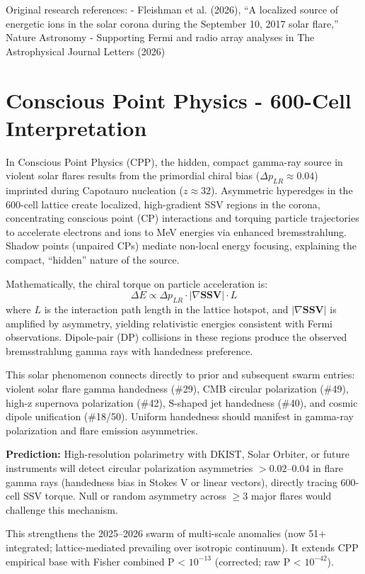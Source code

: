 \documentclass[11pt]{article}
\begin{document}
Original research references:  
- Fleishman et al. (2026), ``A localized source of energetic ions in the solar corona during the September 10, 2017 solar flare,'' Nature Astronomy  
- Supporting Fermi and radio array analyses in The Astrophysical Journal Letters (2026)

\section{Conscious Point Physics - 600-Cell Interpretation}
In Conscious Point Physics (CPP), the hidden, compact gamma-ray source in violent solar flares results from the primordial chiral bias ($\Delta p_{LR} \approx 0.04$) imprinted during Capotauro nucleation ($z \approx 32$). Asymmetric hyperedges in the 600-cell lattice create localized, high-gradient SSV regions in the corona, concentrating conscious point (CP) interactions and torquing particle trajectories to accelerate electrons and ions to MeV energies via enhanced bremsstrahlung. Shadow points (unpaired CPs) mediate non-local energy focusing, explaining the compact, ``hidden'' nature of the source.

Mathematically, the chiral torque on particle acceleration is:  
\[
\Delta E \propto \Delta p_{LR} \cdot |\nabla \mathbf{SSV}| \cdot L
\]  
where $L$ is the interaction path length in the lattice hotspot, and $|\nabla \mathbf{SSV}|$ is amplified by asymmetry, yielding relativistic energies consistent with Fermi observations. Dipole-pair (DP) collisions in these regions produce the observed bremsstrahlung gamma rays with handedness preference.

This solar phenomenon connects directly to prior and subsequent swarm entries: violent solar flare gamma handedness (\#29), CMB circular polarization (\#49), high-z supernova polarization (\#42), S-shaped jet handedness (\#40), and cosmic dipole unification (\#18/50). Uniform handedness should manifest in gamma-ray polarization and flare emission asymmetries.

\textbf{Prediction:} High-resolution polarimetry with DKIST, Solar Orbiter, or future instruments will detect circular polarization asymmetries $> 0.02$--$0.04$ in flare gamma rays (handedness bias in Stokes V or linear vectors), directly tracing 600-cell SSV torque. Null or random asymmetry across $\geq 3$ major flares would challenge this mechanism.

This strengthens the 2025--2026 swarm of multi-scale anomalies (now 51+ integrated; lattice-mediated prevailing over isotropic continuum). It extends CPP empirical base with Fisher combined P < $10^{-13}$ (corrected; raw P < $10^{-42}$).
\end{document}

